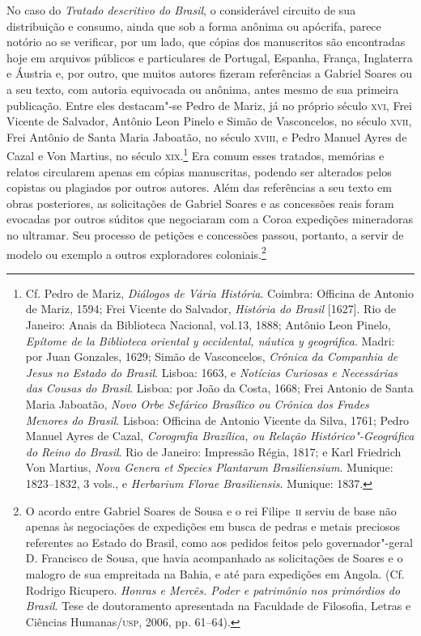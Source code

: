 \documentclass[12pt]{extarticle}
\begin{document}
No caso do \textit{Tratado descritivo do Brasil}, o considerável
circuito de sua distribuição e consumo, ainda que sob a forma anônima
ou apócrifa, parece notório ao se verificar, por um lado, que cópias
dos manuscritos são encontradas hoje em arquivos públicos e
particulares de Portugal, Espanha, França, Inglaterra e Áustria e, por
outro, que muitos autores fizeram referências a Gabriel Soares ou a seu
texto, com autoria equivocada ou anônima, antes mesmo de sua primeira
publicação. Entre eles destacam"-se Pedro de Mariz, já no próprio século
\textsc{xvi}, Frei Vicente de Salvador, Antônio Leon Pinelo e Simão de
Vasconcelos, no século \textsc{xvii}, Frei Antônio de Santa Maria Jaboatão, no
século \textsc{xviii}, e Pedro Manuel Ayres de Cazal e Von Martius, no século
\textsc{xix}.\footnote{ Cf. Pedro de Mariz, \textit{Diálogos de Vária História}.
Coimbra: Officina de Antonio de Mariz, 1594; Frei Vicente do
Salvador,\textit{ História do Brasil} [1627]. Rio de Janeiro: Anais da
Biblioteca Nacional, vol.13, 1888; Antônio Leon Pinelo, \textit{Epítome
de la Biblioteca oriental y occidental, náutica y geográfica}. Madri:
por Juan Gonzales, 1629;  Simão de Vasconcelos, \textit{Crônica
da Companhia de Jesus no Estado do Brasil}. Lisboa: 1663, e
\textit{Notícias Curiosas e Necessárias das Cousas do Brasil}. Lisboa:
por João da Costa, 1668; Frei Antonio de Santa Maria Jaboatão,
\textit{Novo Orbe Sefárico Brasílico ou Crônica dos Frades Menores do
Brasil}. Lisboa: Officina de Antonio Vicente da Silva, 1761; 
Pedro Manuel Ayres de Cazal, \textit{Corografia Brazílica, ou Relação
Histórico"-Geográfica do Reino do Brasil}. Rio de Janeiro: Impressão
Régia, 1817; e Karl Friedrich Von Martius,
\textit{Nova Genera et Species Plantarum
Brasiliensium}. Munique: 1823--1832, 3 vols., e \textit{Herbarium
Florae Brasiliensis}. Munique: 1837.} Era comum esses tratados,
memórias e relatos circularem apenas em cópias manuscritas, podendo ser
alterados pelos copistas ou plagiados por outros autores. Além das
referências a seu texto em obras posteriores, as solicitações de
Gabriel Soares e as concessões reais foram evocadas por outros súditos
que negociaram com a Coroa expedições mineradoras no ultramar. Seu
processo de petições e concessões passou, portanto, a servir de modelo
ou exemplo a outros exploradores coloniais.\footnote{ O acordo entre
Gabriel Soares de Sousa e o rei Filipe~\textsc{ii} serviu de base não apenas
às negociações de expedições em busca de pedras e metais preciosos
referentes ao Estado do Brasil, como aos pedidos feitos pelo 
governador"-geral D. Francisco de Sousa, que havia acompanhado as
solicitações de Soares e o malogro de sua empreitada na Bahia, e até
para expedições em Angola. (Cf. Rodrigo Ricupero. \textit{Honras e Mercês.
Poder e patrimônio nos primórdios do Brasil}. Tese de doutoramento apresentada
na Faculdade de Filosofia, Letras e Ciências Humanas/\textsc{usp}, 2006, pp. 61--64).}
\end{document}
